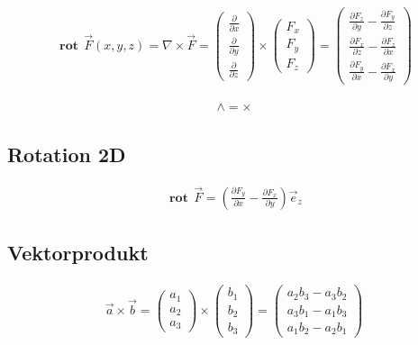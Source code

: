 \documentclass[a4paper, 10pt]{scrartcl}
\begin{document}
		\begin{align}
			\mathbf{\operatorname{rot}}\,\vec F(x,y,z) = \nabla\times \vec F =
			\begin{pmatrix} \frac{\partial}{\partial x} \\ \frac{\partial}{\partial y} \\
				\frac{\partial}{\partial z} \end{pmatrix} \times \begin{pmatrix} F_x\\ F_y\\ F_z
			\end{pmatrix} = \begin{pmatrix} \frac{\partial F_z}{\partial y} - \frac{\partial
				F_y}{\partial z} \\ \frac{\partial F_x}{\partial z} - \frac{\partial
				F_z}{\partial x} \\ \frac{\partial F_y}{\partial x} - \frac{\partial
				F_x}{\partial y} \end{pmatrix}
	\end{align}
	
	\begin{align}
		\mathbf{\wedge = \times}
	\end{align}
	
	\subsection{Rotation 2D}
	\begin{align}
		\mathbf{\operatorname{rot}}\,\vec F = \left (\frac{\partial
			F_y}{\partial x} - \frac{\partial F_x}{\partial y}\right )\vec e_z 
	\end{align}
	
	\subsection{Vektorprodukt}
	\begin{align}
		\vec{a}\times\vec{b} = \begin{pmatrix}a_1 \\ a_2 \\ a_3\end{pmatrix} \times
		\begin{pmatrix}b_1 \\ b_2 \\ b_3 \end{pmatrix} = \begin{pmatrix} a_2b_3 - a_3b_2
			\\ a_3b_1 - a_1b_3 \\ a_1b_2 - a_2b_1 \end{pmatrix}
	\end{align}
	
\end{document}
